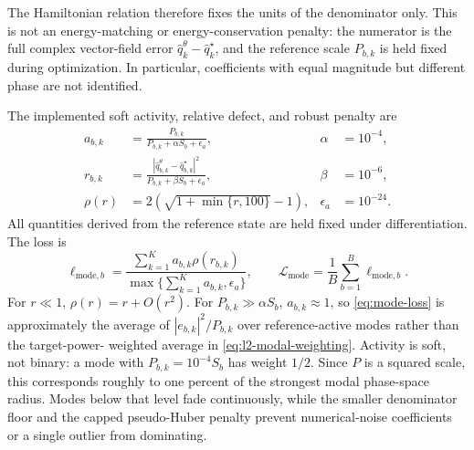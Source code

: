 The Hamiltonian relation therefore fixes the units of the denominator only.
This is not an energy-matching or energy-conservation penalty: the numerator
is the full complex vector-field error
$\widehat q^\theta_k-\widehat q^\star_k$, and the reference scale $P_{b,k}$ is
held fixed during optimization. In particular, coefficients with equal
magnitude but different phase are not identified.

The implemented soft activity, relative defect, and robust penalty are
\begin{align}
  a_{b,k}
  &=\frac{P_{b,k}}{P_{b,k}+\alpha S_b+\epsilon_a},
  &\alpha&=10^{-4},\label{eq:mode-activity}\\
  r_{b,k}
  &=\frac{|\widehat q_{b,k}^\theta-\widehat q_{b,k}^\star|^2}
  {P_{b,k}+\beta S_b+\epsilon_a},
  &\beta&=10^{-6},\label{eq:mode-ratio}\\
  \rho(r)
  &=2\left(\sqrt{1+\min\{r,100\}}-1\right),
  &\epsilon_a&=10^{-24}.
  \label{eq:mode-robust}
\end{align}
All quantities derived from the reference state are held fixed under
differentiation.  The loss is
\begin{equation}
  \ell_{\mathrm{mode},b}
  =\frac{\sum_{k=1}^{K}a_{b,k}\rho(r_{b,k})}
  {\max\{\sum_{k=1}^{K}a_{b,k},\epsilon_a\}},
  \qquad
  \mathcal L_{\mathrm{mode}}
  =\frac1B\sum_{b=1}^B\ell_{\mathrm{mode},b}.
  \label{eq:mode-loss}
\end{equation}
For $r\ll1$, $\rho(r)=r+O(r^2)$.  For $P_{b,k}\gg\alpha S_b$,
$a_{b,k}\approx1$, so \eqref{eq:mode-loss} is approximately the average of
$|e_{b,k}|^2/P_{b,k}$ over reference-active modes rather than the target-power-
weighted average in \eqref{eq:l2-modal-weighting}.  Activity is soft,
not binary: a mode with $P_{b,k}=10^{-4}S_b$ has weight $1/2$.  Since $P$ is a
squared scale, this corresponds roughly to one percent of the strongest modal
phase-space radius. Modes below that level fade continuously, while the smaller
denominator floor and the capped pseudo-Huber penalty prevent numerical-noise
coefficients or a single outlier from dominating.


